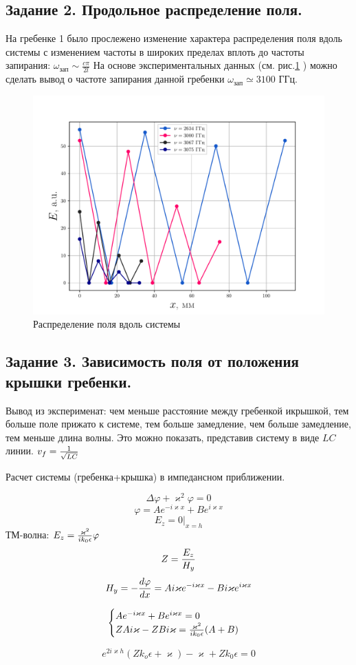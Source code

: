 \subsection*{Задание 2. Продольное распределение поля.} %
На гребенке 1 было прослежено изменение характера распределения поля вдоль системы с изменением частоты в широких пределах вплоть до частоты запирания: $\omega_{\text{зап}}\sim \frac{c \pi}{2l}$ 
На основе экспериментальных данных (см. рис.\ref{fig:2} ) можно сделать вывод о частоте запирания данной гребенки $\omega_{\text{зап}}\simeq 3100 $ ГГц. 
\begin{figure}[h!]
    \centering
    \includegraphics[width=0.9\linewidth]{rec/task2.pdf}
    \caption{Распределение поля вдоль системы}
    \label{fig:2}
\end{figure}

\subsection*{Задание 3. Зависимость поля от положения крышки гребенки.} %
Вывод из эксперименат: чем меньше расстояние между гребенкой икрышкой, тем больше поле прижато к системе, тем больше замедление, чем больше замедление, тем меньше длина волны. Это можно показать, представив систему в виде $LC$ линии. $v_f={{1}\over{\sqrt{LC}}}$

Расчет системы (гребенка+крышка) в импедансном приближении.

$$\Delta \varphi +\varkappa^2\varphi=0$$
$$\varphi=Ae^{-i\varkappa x}+Be^{i\varkappa x}$$
$$E_z=0 | _{x=h}$$ ТМ-волна: $E_z={{\varkappa^2}\over{ik_0\epsilon}}\varphi$
$$Z={{E_z}\over{H_y}}$$ 
$$H_y=-{{d\varphi}\over{dx}}=Ai\varkappa e^{-i\varkappa x}-Bi\varkappa e^{i\varkappa x}$$


\begin{equation}
		\begin{cases}
				A e^{-i\varkappa x}+Be^{i\varkappa x}=0 \\
				ZAi\varkappa-ZBi\varkappa={{\varkappa^2}\over{ik_0\epsilon}}(A+B) \\
			
		\end{cases}
\end{equation}

$$e^{2i\varkappa h}(Zk_o\epsilon+\varkappa)-\varkappa+Zk_0\epsilon=0$$


